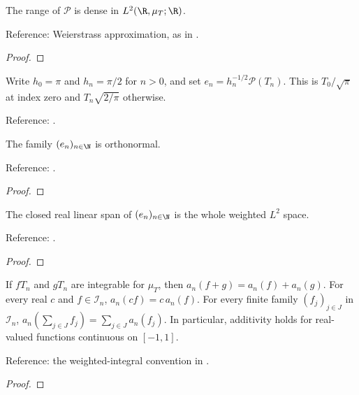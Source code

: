 \begin{supporting}
\begin{theorem}
The range of $\mathcal P$ is dense in $L^2(\R,\mu_T;\R)$.

Reference: Weierstrass approximation, as in \cite[Chapter 1]{atap}.
\end{theorem}
\begin{proof}
\leanok
\end{proof}

\begin{definition}
\label{def:T-normalised}
\leanok

Write $h_0=\pi$ and $h_n=\pi/2$ for $n>0$, and set
$e_n=h_n^{-1/2}\mathcal P(T_n)$.
This is $T_0/\sqrt\pi$ at index zero and $T_n\sqrt{2/\pi}$ otherwise.

Reference: \cite[Table 18.3.1]{dlmf}.
\end{definition}

\begin{theorem}
\label{thm:T-orthonormal}
\leanok

The family $(e_n)_{n\in\N}$ is orthonormal.

Reference: \cite[Table 18.3.1]{dlmf}.
\end{theorem}
\begin{proof}
\leanok
\end{proof}

\begin{theorem}
\label{thm:T-dense}
\leanok
{}
The closed real linear span of $(e_n)_{n\in\N}$ is the whole weighted $L^2$ space.

Reference: \cite[Chapters 1 and 3]{atap}.
\end{theorem}
\begin{proof}
\leanok
\end{proof}

\begin{theorem}
\label{thm:coefficient-linear}
\leanok
{}
If $fT_n$ and $gT_n$ are integrable for $\mu_T$, then
$a_n(f+g)=a_n(f)+a_n(g)$. For every real $c$ and $f\in\mathcal I_n$,
$a_n(cf)=c\,a_n(f)$. For every finite family $(f_j)_{j\in J}$ in $\mathcal I_n$, $a_n(\sum_{j\in J}f_j)=\sum_{j\in J}a_n(f_j)$. In particular, additivity holds for real-valued functions continuous
on $[-1,1]$.

Reference: the weighted-integral convention in \cite[Chapter 3]{atap}.
\end{theorem}
\begin{proof}
\leanok
\end{proof}

\end{supporting}

